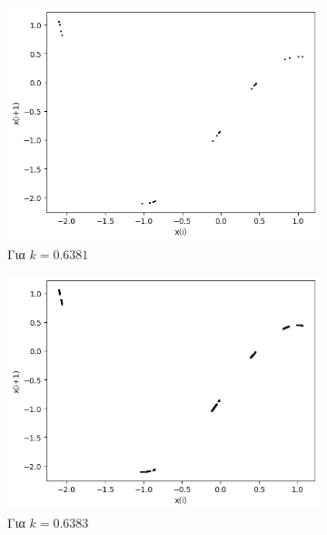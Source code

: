 \begin{figure}[ht]
	\centering
	\begin{subfigure}[b]{0.4\textwidth}
		\centering
		\includegraphics[width=\textwidth]{LateX images/graphs q21/g9}
		\caption{Για $k=0.6381$}
		\label{f:k109}
	\end{subfigure}
	\hfill
	\begin{subfigure}[b]{0.4\textwidth}
		\centering
		\includegraphics[width=\textwidth]{LateX images/graphs q21/g10}
		\caption{Για $k=0.6383$}
		\label{f:k110}
	\end{subfigure}
	\hfill
	\begin{subfigure}[b]{0.4\textwidth}
		\centering

\end{subfigure}
\end{figure}
